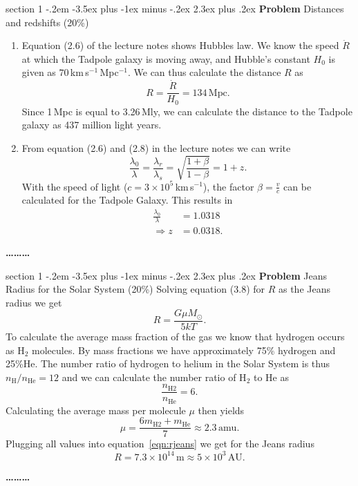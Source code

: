 \documentclass[letterpaper,12pt,twoside=false,DIV=11]{scrartcl}
\makeatletter
\newenvironment{problem}{\@startsection
    {section}
    {1}
    {-.2em}
    {-3.5ex plus -1ex minus -.2ex}
    {2.3ex plus .2ex}
    {
        \pagebreak[3] %
        \noindent\sffamily\bfseries Problem
    }
}
{
    \begin{center}\large\bfseries\ldots\ldots\ldots\end{center}
}
\makeatother
\begin{document}
\begin{problem}{Distances and redshifts (20\%)}

\begin{enumerate}
    \item Equation (2.6) of the lecture notes shows Hubbles law. We know the speed $\dot{R}$ at which the Tadpole galaxy is moving away, and Hubble's constant $H_0$ is given as $70\,$km\,s$^{-1}$\,Mpc$^{-1}$. We can thus calculate the distance $R$ as
    \begin{equation}
        R = \frac{\dot{R}}{H_0} = 134\,\mathrm{Mpc}.
    \end{equation}
    Since 1\,Mpc is equal to 3.26\,Mly, we can calculate the distance to the Tadpole galaxy as 437 million light years.

    \item From equation (2.6) and (2.8) in the lecture notes we can write
    \begin{equation}
        \frac{\lambda_0}{\lambda} = \frac{\lambda_r}{\lambda_s} = \sqrt{\frac{1+\beta}{1-\beta}} = 1+z.
    \end{equation}
    With the speed of light ($c=3\times10^{5}$\,km\,s$^{-1}$), the factor $\beta = \frac{v}{c}$ can be calculated for the Tadpole Galaxy. This results in
    \begin{align}
        \frac{\lambda_0}{\lambda} &= 1.0318\\
        \Rightarrow z &= 0.0318.
    \end{align}
\end{enumerate}


\end{problem}


\begin{problem}{Jeans Radius for the Solar System (20\%)} 
    Solving equation (3.8) for $R$ as the Jeans radius we get
    \begin{equation}
        R = \frac{G\mu M_\odot}{5kT}. \label{eqn:rjeans}
    \end{equation}
    To calculate the average mass fraction of the gas we know that hydrogen occurs as H$_2$ molecules. By mass fractions we have approximately 75\% hydrogen and 25\%He. The number ratio of hydrogen to helium in the Solar System is thus $n_\mathrm{H}/n_\mathrm{He} = 12$ and we can calculate the number ratio of H$_2$ to He as
    \begin{equation}
        \frac{n_\mathrm{H2}}{n_\mathrm{He}} = 6.
    \end{equation}
    Calculating the average mass per molecule $\mu$ then yields
    \begin{equation}
        \mu = \frac{6 m_\mathrm{H2} + m_\mathrm{He}}{7} \approx 2.3\,\mathrm{amu}.
    \end{equation}
    Plugging all values into equation~\eqref{eqn:rjeans} we get for the Jeans radius
    \begin{equation}
        R = 7.3\times10^{14}\,\mathrm{m} \approx 5\times10^{3}\,\mathrm{AU}.
    \end{equation}

\end{problem}
\end{document}
